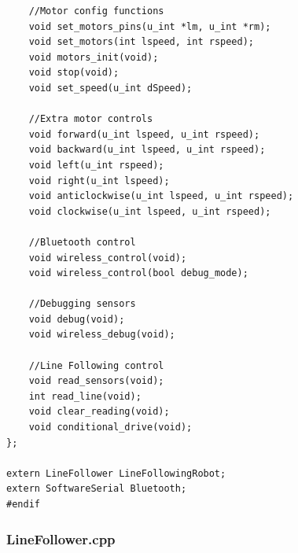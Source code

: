 \documentclass[14pt,a4paper]{extarticle}
\begin{document}
\begin{verbatim}
    //Motor config functions
    void set_motors_pins(u_int *lm, u_int *rm);
    void set_motors(int lspeed, int rspeed);
    void motors_init(void);
	void stop(void);
	void set_speed(u_int dSpeed);

	//Extra motor controls
	void forward(u_int lspeed, u_int rspeed);
	void backward(u_int lspeed, u_int rspeed);
	void left(u_int rspeed);
	void right(u_int lspeed);
	void anticlockwise(u_int lspeed, u_int rspeed);
	void clockwise(u_int lspeed, u_int rspeed);

	//Bluetooth control
	void wireless_control(void);
	void wireless_control(bool debug_mode);

	//Debugging sensors
	void debug(void);
	void wireless_debug(void);

	//Line Following control
	void read_sensors(void);
	int read_line(void);
	void clear_reading(void);
	void conditional_drive(void);
};

extern LineFollower LineFollowingRobot;
extern SoftwareSerial Bluetooth;
#endif
	\end{verbatim}
	
	
	\subsubsection{LineFollower.cpp}
	
\end{document}
